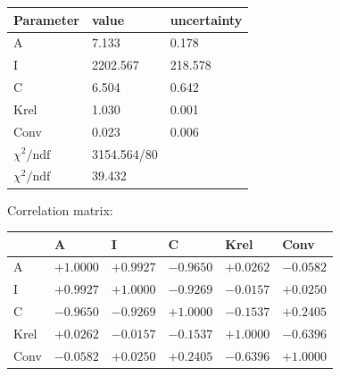 \begin{tabular}{l|ll}
Parameter & value & uncertainty \\ \hline
 A & 7.133 & 0.178 \\ 
 I & 2202.567 & 218.578 \\ 
 C & 6.504 & 0.642 \\ 
 Krel & 1.030 & 0.001 \\ 
 Conv & 0.023 & 0.006 \\ 
 \hline
 $\chi^2/\mathrm{ndf}$ & 3154.564/80 & \\
 $\chi^2/\mathrm{ndf}$ & 39.432 & \\
\end{tabular}

Correlation matrix:

\begin{tabular}{l|lllll} 
 & A & I & C & Krel & Conv \\ \hline
 A & $+1.0000$ & $+0.9927$ & $-0.9650$ & $+0.0262$ & $-0.0582$ \\ 
 I & $+0.9927$ & $+1.0000$ & $-0.9269$ & $-0.0157$ & $+0.0250$ \\ 
 C & $-0.9650$ & $-0.9269$ & $+1.0000$ & $-0.1537$ & $+0.2405$ \\ 
 Krel & $+0.0262$ & $-0.0157$ & $-0.1537$ & $+1.0000$ & $-0.6396$ \\ 
 Conv & $-0.0582$ & $+0.0250$ & $+0.2405$ & $-0.6396$ & $+1.0000$ \\ 
\end{tabular}
